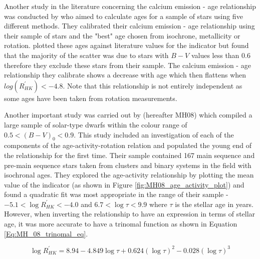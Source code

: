 Another study in the literature concerning the calcium emission - age relationship was conducted by \citet{Lachaume_etal_1999} who aimed to calculate ages for a sample of stars using five different methods. They calibrated their calcium emission - age relationship using their sample of stars and the "best" age chosen from isochrone, metallicity or rotation. \citet{Lachaume_etal_1999} plotted these ages against literature values for the \Rprime indicator but found that the majority of the scatter was due to stars with $B - V$ values less than 0.6 therefore they exclude these stars from their sample. The calcium emission - age relationship they calibrate shows a decrease with age which then flattens when $log(R^{'}_{HK}) < -4.8$. Note that this relationship is not entirely independent as some ages have been taken from rotation measurements.

Another important study was carried out by \citet{Mamajek_Hillenbrand_2008} (hereafter MH08) which compiled a large sample of solar-type dwarfs within the colour range of $0.5 < (B-V)_{0} < 0.9$. This study included an investigation of each of the components of the age-activity-rotation relation and populated the young end of the relationship for the first time. Their sample contained 167 main sequence and pre-main sequence stars taken from clusters and binary systems in the field with isochronal ages. They explored the age-activity relationship by plotting the mean value of the \Rprime indicator (as shown in Figure \ref{fig:MH08_age_activity_plot}) and found a quadratic fit was most appropriate in the range of their sample - $-5.1 < \log R^{'}_{HK} < -4.0$ and $6.7 < \log\tau < 9.9$ where $\tau$ is the stellar age in years. However, when inverting the relationship to have an expression in terms of stellar age, it was more accurate to have a trinomal function as shown in Equation \ref{Eq:MH_08_trinomal_eq}.

\begin{equation}
    \log R^{'}_{HK} = 8.94 - 4.849\log\tau + 0.624(\log\tau)^{2} - 0.028(\log\tau)^{3}
    \label{Eq:MH_08_trinomal_eq}
\end{equation}

